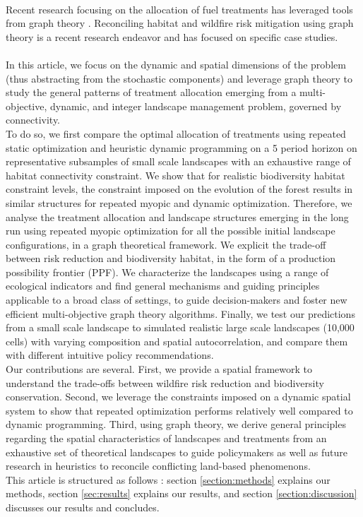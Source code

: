 \\
Recent research focusing on the allocation of fuel treatments has leveraged tools from graph theory \citep{matsypura_wildfire_2018, pais_downstream_2021}. Reconciling habitat and wildfire risk mitigation using graph theory is a recent research endeavor \citep{rachmawati_fuel_2018, yemshanov_exploring_2022} and has focused on specific case studies. 
\\\\
\hspace*{1.5em} In this article, we focus on the dynamic and spatial dimensions of the problem (thus abstracting from the stochastic components) and leverage graph theory to study the general patterns of treatment allocation emerging from a multi-objective, dynamic, and integer landscape management problem, governed by connectivity. \\
To do so, we first compare the optimal allocation of treatments using repeated static optimization and heuristic dynamic programming on a 5 period horizon on representative subsamples of small scale landscapes with an exhaustive range of habitat connectivity constraint. We show that for realistic biodiversity habitat constraint levels, the constraint imposed on the evolution of the forest results in similar structures for repeated myopic and dynamic optimization. Therefore, we analyse the treatment allocation and landscape structures emerging in the long run using repeated myopic optimization for all the possible initial landscape configurations, in a graph theoretical framework. We explicit the trade-off between risk reduction and biodiversity habitat, in the form of a production possibility frontier (PPF). We characterize the landscapes using a range of ecological indicators and find general mechanisms and guiding principles applicable to a broad class of settings, to guide decision-makers and foster new efficient multi-objective graph theory algorithms. Finally, we test our predictions from a small scale landscape to simulated realistic large scale landscapes (10,000 cells)  with varying composition and spatial autocorrelation, and compare them with different intuitive policy recommendations. 
\\
Our contributions are several. First, we provide a spatial framework to understand the trade-offs between wildfire risk reduction and biodiversity conservation. Second, we leverage the constraints imposed on a dynamic spatial system to show that repeated optimization performs relatively well compared to dynamic programming. Third, using graph theory, we derive general principles regarding the spatial characteristics of landscapes and treatments from an exhaustive set of theoretical landscapes to guide policymakers as well as future research in heuristics to reconcile conflicting land-based phenomenons.
\\
This article is structured as follows : section \ref{section:methods} explains our methods, section \ref{sec:results} explains our results, and section 
\ref{section:discussion} discusses our results and concludes. 

